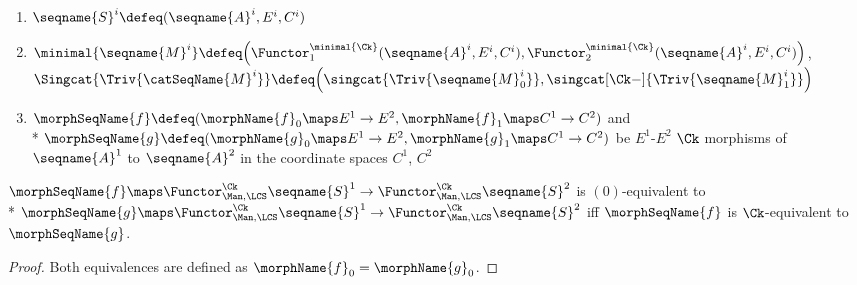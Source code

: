 \documentclass{article}
\begin{document}
\begin{lemma}
\begin{enumerate}
\item
$\seqname{S}^i \defeq (\seqname{A}^i, E^i, C^i)$
\item
$
  \minimal{\seqname{M}^i} \defeq
    \Bigl (
      \Functor^{\minimal{\Ck}}_1 (\seqname{A}^i, E^i, C^i),
      \Functor^{\minimal{\Ck}}_2 (\seqname{A}^i, E^i, C^i)
    \Bigr )
$,
$
  \Singcat{\Triv{\catSeqName{M}^i}} \defeq
    \Bigl (
      \singcat{\Triv{\seqname{M}^i_0}},
      \singcat[\Ck-]{\Triv{\seqname{M}^i_1}}
    \Bigr )
$
\item
$
  \morphSeqName{f} \defeq
  (
    \morphName{f}_0 \maps E^1 \to E^2,
    \morphName{f}_1 \maps C^1 \to C^2
  )
$
and \\*
$
  \morphSeqName{g} \defeq
  (
    \morphName{g}_0 \maps E^1 \to E^2,
    \morphName{g}_1 \maps C^1 \to C^2
  )
$
be $E^1$-$E^2$ $\Ck$ morphisms of $\seqname{A}^1$ to
$\seqname{A}^2$ in the coordinate spaces $C^1$, $C^2$
\end{enumerate}

$
  \morphSeqName{f} \maps
  \Functor^\Ck_{\Man,\LCS} \seqname{S}^1 \to
  \Functor^\Ck_{\Man,\LCS} \seqname{S}^2
$
is $(0)$-equivalent to \\*
$
  \morphSeqName{g} \maps
  \Functor^\Ck_{\Man,\LCS} \seqname{S}^1 \to
  \Functor^\Ck_{\Man,\LCS} \seqname{S}^2
$
iff $\morphSeqName{f}$ is $\Ck$-equivalent to $\morphSeqName{g}$.

\begin{proof}
Both equivalences are defined as $\morphName{f}_0 = \morphName{g}_0$.
\end{proof}

\end{lemma}
\end{document}
